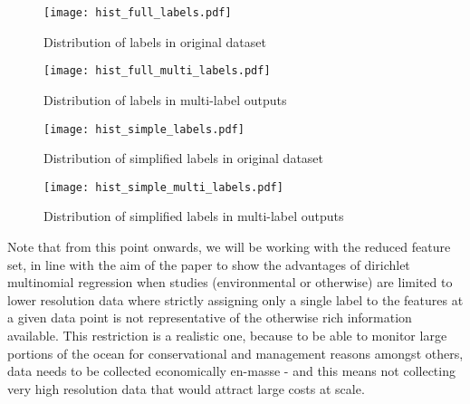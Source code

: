 \begin{figure}[H]
    \begin{minipage}{.47\linewidth}
        \texttt{[image: hist\_full\_labels.pdf]}
        \caption{Distribution of labels in original dataset}
        \label{fig:singlelabeldistr}
    \end{minipage}
    \hfill
    \begin{minipage}{.47\linewidth}
        \texttt{[image: hist\_full\_multi\_labels.pdf]}
        \caption{Distribution of labels in multi-label outputs}
        \label{fig:multilabeldistr}
    \end{minipage}
\end{figure}

\begin{figure}[H]
    \begin{minipage}{.47\linewidth}
        \texttt{[image: hist\_simple\_labels.pdf]}
        \caption{Distribution of simplified labels in original dataset}
        \label{fig:singlelabeldistr}
    \end{minipage}
    \hfill
    \begin{minipage}{.47\linewidth}
        \texttt{[image: hist\_simple\_multi\_labels.pdf]}
        \caption{Distribution of simplified labels in multi-label outputs}
        \label{fig:multilabeldistr}
    \end{minipage}
\end{figure}

Note that from this point onwards, we will be working with the reduced feature set, in line with the aim of the paper to show the advantages of dirichlet multinomial regression when studies (environmental or otherwise) are limited to lower resolution data where strictly assigning only a single label to the features at a given data point is not representative of the otherwise rich information available. This restriction is a realistic one, because to be able to monitor large portions of the ocean for conservational and management reasons amongst others, data needs to be collected economically en-masse - and this means not collecting very high resolution data that would attract large costs at scale.


